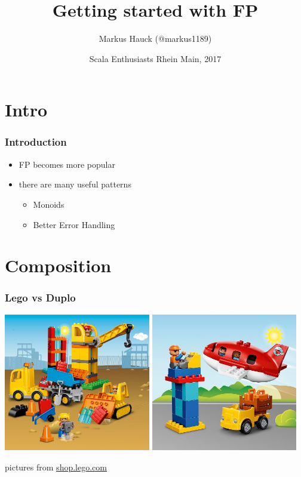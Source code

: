 \documentclass{beamer}
\title{Getting started with FP}
\author{Markus Hauck (@markus1189)}
\date{Scala Enthusiasts Rhein Main, 2017}
\begin{document}
\frame{\titlepage}

\section{Intro}
\label{sec:intro}

\begin{frame}
  \frametitle{Introduction}
  \begin{itemize}
  \item FP becomes more popular
  \item there are many useful patterns
    \begin{itemize}
    \item Monoids
    \item Better Error Handling
    \end{itemize}
  \end{itemize}
\end{frame}

\section{Composition}

\begin{frame}
  \frametitle{Lego vs Duplo}
  \begin{center}
    \includegraphics[width=0.48\textwidth]{../images/duplo-construction.jpg}
    \hspace{1mm}
    \includegraphics[width=0.48\textwidth]{../images/duplo-airport.jpg}
  \end{center}
  \vfill
  \begin{center}
    {\tiny pictures from \url{shop.lego.com}}
  \end{center}
\end{frame}
\end{document}
